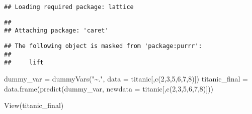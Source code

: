 \documentclass[
]{article}
\newenvironment{Shaded}{\begin{snugshade}}{\end{snugshade}}
\newcommand{\AttributeTok}[1]{\textcolor[rgb]{0.77,0.63,0.00}{#1}}
\newcommand{\DecValTok}[1]{\textcolor[rgb]{0.00,0.00,0.81}{#1}}
\newcommand{\FunctionTok}[1]{\textcolor[rgb]{0.00,0.00,0.00}{#1}}
\newcommand{\NormalTok}[1]{#1}
\newcommand{\OtherTok}[1]{\textcolor[rgb]{0.56,0.35,0.01}{#1}}
\newcommand{\StringTok}[1]{\textcolor[rgb]{0.31,0.60,0.02}{#1}}
\begin{document}
\begin{verbatim}
## Loading required package: lattice
\end{verbatim}

\begin{verbatim}
## 
## Attaching package: 'caret'
\end{verbatim}

\begin{verbatim}
## The following object is masked from 'package:purrr':
## 
##     lift
\end{verbatim}

\begin{Shaded}
\begin{Highlighting}[]
\NormalTok{dummy\_var }\OtherTok{=} \FunctionTok{dummyVars}\NormalTok{(}\StringTok{"\textasciitilde{}."}\NormalTok{, }\AttributeTok{data =}\NormalTok{ titanic[,}\FunctionTok{c}\NormalTok{(}\DecValTok{2}\NormalTok{,}\DecValTok{3}\NormalTok{,}\DecValTok{5}\NormalTok{,}\DecValTok{6}\NormalTok{,}\DecValTok{7}\NormalTok{,}\DecValTok{8}\NormalTok{)])}
\NormalTok{titanic\_final }\OtherTok{=} \FunctionTok{data.frame}\NormalTok{(}\FunctionTok{predict}\NormalTok{(dummy\_var, }\AttributeTok{newdata =}\NormalTok{ titanic[,}\FunctionTok{c}\NormalTok{(}\DecValTok{2}\NormalTok{,}\DecValTok{3}\NormalTok{,}\DecValTok{5}\NormalTok{,}\DecValTok{6}\NormalTok{,}\DecValTok{7}\NormalTok{,}\DecValTok{8}\NormalTok{)]))}
  
\FunctionTok{View}\NormalTok{(titanic\_final)}
\end{Highlighting}
\end{Shaded}
\end{document}
